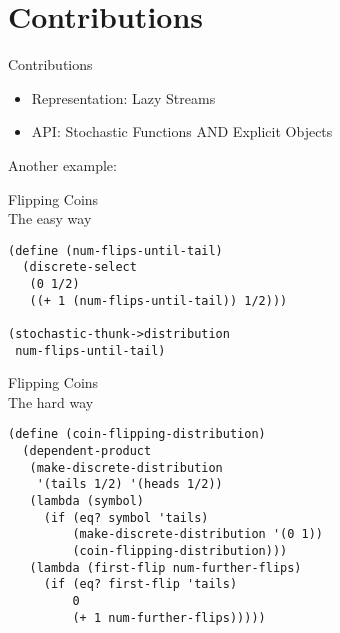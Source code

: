 \documentclass{beamer}
\begin{document}
\section*{Contributions}

\begin{frame}

\begin{center}
{\Huge Contributions}
\end{center}
\large
  \begin{itemize}
  \item Representation: \alert{Lazy Streams}
  \item API: \alert{Stochastic Functions} AND \alert{Explicit Objects}
  \end{itemize}
  
\end{frame}

\begin{frame}
\begin{center}
\Huge Another example:
\end{center}
\end{frame}

\begin{frame}[fragile=singleslide]

\begin{center}
{\Huge Flipping Coins} \\
The easy way
\end{center}

\begin{verbatim}
(define (num-flips-until-tail)
  (discrete-select
   (0 1/2)
   ((+ 1 (num-flips-until-tail)) 1/2)))

(stochastic-thunk->distribution
 num-flips-until-tail)
\end{verbatim}
\end{frame}

\begin{frame}[fragile=singleslide]

\begin{center}
{\Huge Flipping Coins} \\
The hard way
\end{center}

\begin{verbatim}
(define (coin-flipping-distribution)
  (dependent-product
   (make-discrete-distribution
    '(tails 1/2) '(heads 1/2))
   (lambda (symbol)
     (if (eq? symbol 'tails)
         (make-discrete-distribution '(0 1))
         (coin-flipping-distribution)))
   (lambda (first-flip num-further-flips)
     (if (eq? first-flip 'tails)
         0
         (+ 1 num-further-flips)))))
\end{verbatim}
\end{frame}
\end{document}
